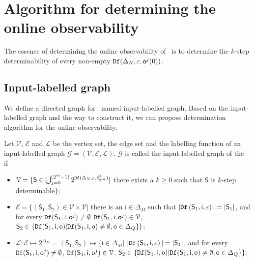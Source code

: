 \section{Algorithm for determining the online observability}
\label{sec:deter}
The essence of determining the online observability of \BCN\ is to determine the $k$-step determinability of every non-empty ${\tt Df}(\Delta_N,\varepsilon, \mathsf{o}^{j}(0))$. 

\subsection{Input-labelled graph}
We define a directed graph for \BCN\ named input-labelled graph. Based on the input-labelled graph and the way to construct it, we can propose determination algorithm for the online observability.

\begin{definition}
Let $\mathcal{V}$, $\mathcal{E}$ and $\mathcal{L}$ be the vertex set, the edge set and the labelling function of an input-labelled graph $\mathcal{G}=(\mathcal{V}, \mathcal{E}, \mathcal{L})$. $\mathcal{G}$ is called the input-labelled graph of the \BCN\, if 
\begin{itemize}
\item  $\mathcal{V}=\{\mathsf{S}\in\bigcup_{j=0}^{(2^m -1)} 2^{{\tt Df}(\Delta_N,\varepsilon,\delta^j_{2^m} )}|$ there exists a $k\ge0$ such that $\mathsf{S}$ is $k$-step determinable$\}$;
\item  $\mathcal{E}=\{(\mathsf{S}_1,\mathsf{S}_2)\in \mathcal{V}\times \mathcal{V}|$ there is an $\mathsf{i} \in \Delta_M$ such that $|{\tt Df}\left(\mathsf{S}_1,\mathsf{i},\varepsilon\right)|=|\mathsf{S}_1|$, and for every ${\tt Df}(\mathsf{S}_1,\mathsf{i},\mathsf{o}^{j})\neq \emptyset$ ${\tt Df}(\mathsf{S}_1,\mathsf{i},\mathsf{o}^{j})\in \mathcal{V}$, $\mathsf{S}_2\in\{{\tt Df}(\mathsf{S}_1,\mathsf{i},\mathsf{o})| {\tt Df}(\mathsf{S}_1,\mathsf{i},\mathsf{o})\neq \emptyset, \mathsf{o}\in \Delta_Q\}\}$;
\item  $\mathcal{L}:\mathcal{E}\mapsto 2^{\Delta_M}=(\mathsf{S}_1,\mathsf{S}_2)\mapsto\{\mathsf{i}\in \Delta_M|$ $|{\tt Df}\left(\mathsf{S}_1,\mathsf{i},\varepsilon\right)|=|\mathsf{S}_1|$, and for every ${\tt Df}(\mathsf{S}_1,\mathsf{i},\mathsf{o}^{j})\neq \emptyset$, ${\tt Df}(\mathsf{S}_1,\mathsf{i},\mathsf{o}^{j})\in \mathcal{V}$, $\mathsf{S}_2\in\{{\tt Df}(\mathsf{S}_1,\mathsf{i},\mathsf{o})| {\tt Df}(\mathsf{S}_1,\mathsf{i},\mathsf{o})\neq \emptyset, \mathsf{o}\in \Delta_Q\}\}$.
 \end{itemize}
\end{definition}

